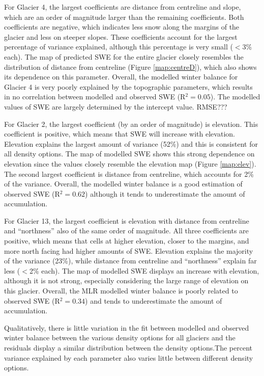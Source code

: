 \documentclass[12pt]{article}
\begin{document}
For Glacier 4, the largest coefficients are distance from centreline and slope, which are an order of magnitude larger than the remaining coefficients. Both coefficients are negative, which indicates less snow along the margins of the glacier and less on steeper slopes. These coefficients account for the largest percentage of variance explained, although this percentage is very small ($<3$\% each). The map of predicted SWE for the entire glacier closely resembles the distribution of distance from centreline (Figure \ref{map:centreD}), which also shows its dependence on this parameter. Overall, the modelled winter balance for Glacier 4 is very poorly explained by the topographic parameters, which results in no correlation between modelled and observed SWE (R$^2=0.05$). The modelled values of SWE are largely determined by the intercept value. RMSE???

For Glacier 2, the largest coefficient (by an order of magnitude) is elevation. This coefficient is positive, which means that SWE will increase with elevation. Elevation explains the largest amount of variance (52\%) and this is consistent for all density options. The map of modelled SWE shows this strong dependence on elevation since the values closely resemble the elevation map (Figure \ref{map:elev}). The second largest coefficient is distance from centreline, which accounts for 2\% of the variance. Overall, the modelled winter balance is a good estimation of observed SWE (R$^2=0.62$) although it tends to underestimate the amount of accumulation. 

For Glacier 13, the largest coefficient is elevation with distance from centreline and ``northness'' also of the same order of magnitude. All three coefficients are positive, which means that cells at higher elevation, closer to the margins, and more north facing had higher amounts of SWE. Elevation explains the majority of the variance (23\%), while distance from centreline and ``northness'' explain far less ($<$2\% each). The map of modelled SWE displays an increase with elevation, although it is not strong, especially considering the large range of elevation on this glacier. Overall, the MLR modelled winter balance is poorly related to observed SWE (R$^2=0.34$) and tends to underestimate the amount of accumulation.

Qualitatively, there is little variation in the fit between modelled and observed winter balance between the various density options for all glaciers and the residuals display a similar distribution between the density options.The percent variance explained by each parameter also varies little between different density options. 
\end{document}
